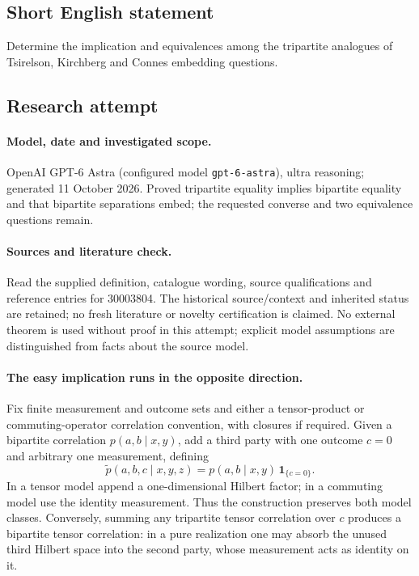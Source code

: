 \documentclass[11pt]{article}
\begin{document}
\subsection{Short English statement}
Determine the implication and equivalences among the tripartite analogues of Tsirelson, Kirchberg and Connes embedding questions.
\subsection{Research attempt}
\paragraph{Model, date and investigated scope.}
OpenAI GPT-6 Astra (configured model \texttt{gpt-6-astra}), ultra reasoning; generated 11 October 2026. Proved tripartite equality implies bipartite equality and that bipartite separations embed; the requested converse and two equivalence questions remain.

\paragraph{Sources and literature check.}
Read the supplied definition, catalogue wording, source qualifications and reference entries for 30003804. The historical source/context and inherited status are retained; no fresh literature or novelty certification is claimed. No external theorem is used without proof in this attempt; explicit model assumptions are distinguished from facts about the source model.

\paragraph{The easy implication runs in the opposite direction.} Fix finite measurement and outcome sets and either a tensor-product or commuting-operator correlation convention, with closures if required. Given a bipartite correlation \(p(a,b\mid x,y)\), add a third party with one outcome \(c=0\) and arbitrary one measurement, defining
\[
 \widetilde p(a,b,c\mid x,y,z)=p(a,b\mid x,y)\,\mathbf1_{\{c=0\}}.
\]
In a tensor model append a one-dimensional Hilbert factor; in a commuting model use the identity measurement. Thus the construction preserves both model classes. Conversely, summing any tripartite tensor correlation over \(c\) produces a bipartite tensor correlation: in a pure realization one may absorb the unused third Hilbert space into the second party, whose measurement acts as identity on it.
\end{document}
